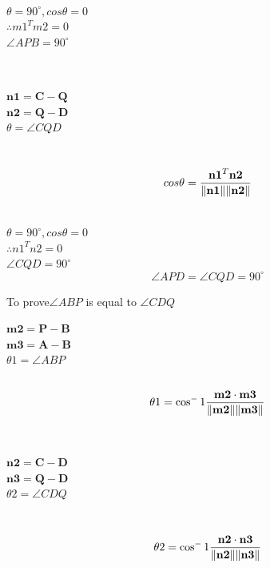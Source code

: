 \documentclass[10pt, a4paper]{article}
\let\vec\mathbf
\begin{document}
	\begin{center}\
		\\
	$\theta = 90^{\circ}, cos\theta = 0$\\
	$\therefore m1^T m2 = 0$\\
	$\angle{APB} = 90^{\circ}$
	\end{center}\
	\\
	\begin{center}
	$\vec{n1} = \vec{C-Q}$\\
	$\vec{n2} = \vec{Q-D}$\\
	$\theta = \angle{CQD}$\\
	\end{center}\
	\\
		\begin {equation}
		cos\theta = \frac{\vec{n1}^T \vec{n2}}{\norm{\vec{n1}}\norm{\vec{n2}}}
		\end {equation}
	
	\begin{center}\
		\\
	$\theta = 90^{\circ}, cos\theta = 0$\\
		$\therefore n1^T n2 = 0$\\
		$\angle {CQD} = 90^{\circ}$
		\
		\\
		\begin{equation}
	   \angle {APD} = \angle {CQD} = 90^{\circ}
		\end{equation}
	\end{center}
	To prove$\angle {ABP}$ is equal to $\angle {CDQ}$
	\begin{center}
	$\vec{m2} = \vec{P-B}$\\
	$\vec{m3} = \vec{A-B}$\\
	$\theta1 = \angle {ABP}$\\
		\
		\\
		\begin{equation}
	\theta1 = \cos^-1\frac{\vec{m2} \cdot \vec{m3}}{\norm{\vec{m2}}\norm{\vec{m3}}}
		\end{equation}
	\end{center}
\
\\
	\begin{center}
	$\vec{n2} = \vec{C-D}$\\
	$\vec{n3} = \vec{Q-D}$\\
	$\theta2 = \angle {CDQ}$\\
		
	\end{center}
	\
	\\
		\begin{equation}
	\theta2 = \cos^-1\frac{\vec{n2} \cdot \vec{n3}}{\norm{\vec{n2}}\norm{\vec{n3}}}
		\end{equation}
	 		
\end{document}
